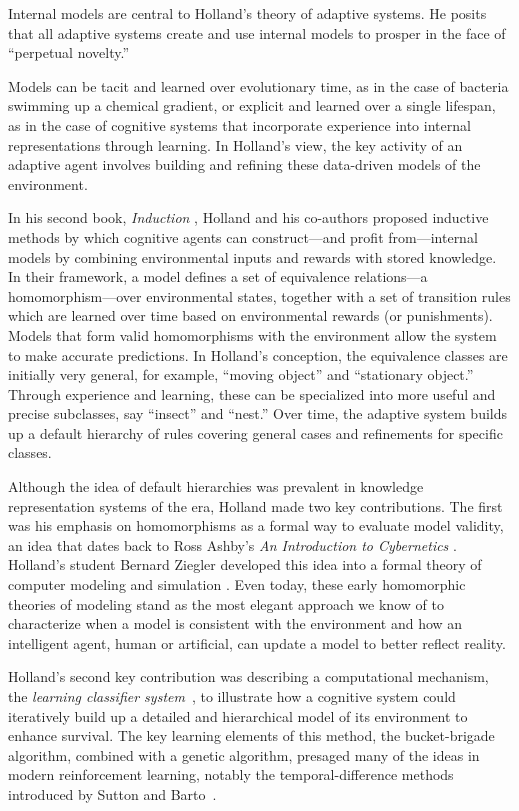 \documentclass{sig-alternate}
\begin{document}
Internal models are central to Holland's theory of adaptive systems.
He posits that all adaptive systems create and use internal models to
prosper in the face of ``perpetual novelty.'' 

Models can be tacit and learned over evolutionary time, as in the
case of bacteria swimming up a chemical gradient, or explicit and
learned over a single lifespan, as in the case of cognitive systems
that incorporate experience into internal representations through
learning.  In Holland's view, the key activity of an adaptive agent
involves building and refining these data-driven models of the
environment.

In his second book, \emph{Induction} \cite{Holland1989}, Holland and
his co-authors proposed inductive methods by which cognitive agents
can construct---and profit from---internal models by combining
environmental inputs and rewards with stored knowledge.  In their
framework, a model defines a set of equivalence relations---a
homomorphism---over environmental states, together with a set of
transition rules which are learned over time based on environmental
rewards (or punishments).  Models that form valid homomorphisms with
the environment allow the system to make accurate predictions.  In
Holland's conception, the equivalence classes are initially very
general, for example, ``moving object'' and ``stationary object.''
Through experience and learning, these can be specialized into more
useful and precise subclasses, say ``insect'' and ``nest.''  Over
time, the adaptive system builds up a default hierarchy of rules
covering general cases and refinements for specific classes.

Although the idea of default hierarchies was prevalent in knowledge
representation systems of the era, Holland made two key contributions.
The first was his emphasis on homomorphisms as a formal way to
evaluate model validity, an idea that dates back to Ross Ashby's
\emph{An Introduction to Cybernetics} \cite{Ashby1956}. Holland's
student Bernard Ziegler developed this idea into a formal theory of
computer modeling and simulation \cite{Ziegler1976}.  Even today,
these early homomorphic theories of modeling stand as the most elegant
approach we know of to characterize when a model is consistent with
the environment and how an intelligent agent, human or artificial, can
update a model to better reflect reality.

Holland's second key contribution was describing a computational
mechanism, the \emph{learning classifier
  system}~\cite{Holland1986,Holland1977}, to illustrate how a cognitive system could
iteratively build up a detailed and hierarchical model of its
environment to enhance survival.  The key learning elements of this method, the
bucket-brigade algorithm, combined with a genetic algorithm, presaged many of the ideas in modern reinforcement
learning, notably the temporal-difference methods introduced by
Sutton and Barto~\cite{SuttonAndBarto1990}.
\end{document}
